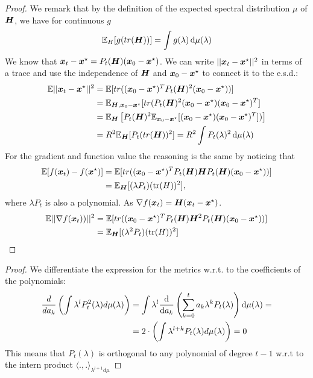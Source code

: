 \documentclass{article}
\begin{document}
\metrics*
\begin{proof}
\newcommand\xinit{\xx_0-\xx^\star}
We remark that by the definition of the expected spectral distribution $\mu$ of ${\boldsymbol H}$, we have for continuous $g$
\begin{equation}
    {\mathbb{E}}_H[g(tr({\boldsymbol H}))]=\int g(\lambda)\mathop{}\!\mathrm{d} \mu(\lambda) 
\end{equation}
We know that $\xx_t-\xx^\star=P_t(\HH)(\xinit)$. We can write $||{\boldsymbol x}_t-{\boldsymbol x}^\star||^2$ in terms of a trace and use the independence of ${\boldsymbol H}$ and $\xinit$ to connect it to the e.s.d.:
\begin{align}
    \mathbb{E}||\xx_t-\xx^\star||^2&=\EE[ tr((\xinit)^TP_t(\HH)^2(\xinit))] \\
    &=\EE_{\HH,\xinit} [tr(P_t(\HH)^2(\xinit)(\xinit)^T]\\
    &=\EE_\HH\left[P_t(\HH)^2\EE_{\xinit}[(\xinit)(\xinit)^T])\right]  \\
    &=R^2\EE_\HH[P_t(tr(\HH))^2]=R^2 \int P_t(\lambda)^2\dif\mu(\lambda)
\end{align}
For the gradient and function value the reasoning is the same by noticing that
\begin{align}
    \EE[f(\xx_t)-f(\xx^\star)]&=\EE[ tr((\xinit)^TP_t(\HH)\HH P_t(\HH)(\xinit))]\\
    &=\EE_\HH[(\lambda P_t)(\tr(H))^2],
\end{align}
where $\lambda P_t$ is also a  polynomial. As $\nabla f({\boldsymbol x}_t)={\boldsymbol H}({\boldsymbol x}_t-{\boldsymbol x}^\star)$.
\begin{align}
    \EE||\nabla f(\xx_t))||^2&=\EE[ tr((\xinit)^TP_t(\HH)\HH^2 P_t(\HH)(\xinit))]\\
    &=\EE_\HH[(\lambda^2 P_t)(\tr(H))^2]
\end{align}


\end{proof}

\optimality*
\begin{proof}
We differentiate the expression for the metrics w.r.t. to the coefficients of the polynomials:
\begin{align*}
    \frac{d}{da_k}\left(\int \lambda^lP_t^2(\lambda)d\mu(\lambda)\right)&=\int\lambda^l\frac{\mathop{}\!\mathrm{d}}{\mathop{}\!\mathrm{d} a_k}\left(\sum_{k=0}^t a_k\lambda^kP_t(\lambda) \right) \mathop{}\!\mathrm{d} \mu(\lambda)=
    \\&=2\cdot\left(\int \lambda^{l+k}P_t(\lambda)d\mu(\lambda)\right)=0
\end{align*}
This means that $P_t(\lambda)$ is orthogonal to any polynomial of degree $t-1$  w.r.t to the intern product $\langle.,.\rangle_{\lambda^{l+1}d\mu}$

\end{proof}
\end{document}
